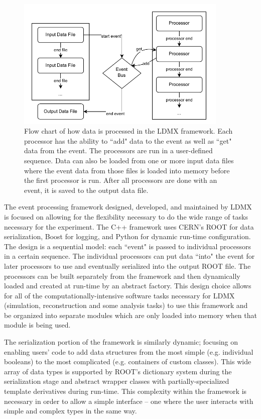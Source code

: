 \begin{figure}
    \centering
    \includegraphics[width=0.9\textwidth]{figures/ldmx/simulation/FrameworkFlowChart.drawio.pdf}
    \caption{Flow chart of how data is processed in the LDMX framework. Each processor has the ability to ``add" data to the event as well as ``get" data from the event. The processors are run in a user-defined sequence. Data can also be loaded from one or more input data files where the event data from those files is loaded into memory before the first processor is run. After all processors are done with an event, it is saved to the output data file.}
    \label{fig:ldmx:sim:data-flow}
\end{figure}

The event processing framework designed, developed, and maintained by LDMX is focused on allowing for the flexibility necessary to do the wide range of tasks necessary for the experiment. The C++ framework uses CERN's ROOT \cite{cernroot} for data serialization, Boost  for logging, and Python \cite{python} for dynamic run-time configuration. The design is a sequential model: each ``event" is passed to individual processors in a certain sequence. The individual processors can put data ``into" the event for later processors to use and eventually serialized into the output ROOT file. The processors can be built separately from the framework and then dynamically loaded and created at run-time by an abstract factory. This design choice allows for all of the computationally-intensive software tasks necessary for LDMX (simulation, reconstruction and some analysis tasks) to use this framework and be organized into separate modules which are only loaded into memory when that module is being used.

The serialization portion of the framework is similarly dynamic; focusing on enabling users' code to add data structures from the most simple (e.g. individual booleans) to the most complicated (e.g. containers of custom classes). This wide array of data types is supported by ROOT's dictionary system during the serialization stage and abstract wrapper classes with partially-specialized template derivatives during run-time. This complexity within the framework is necessary in order to allow a simple interface -- one where the user interacts with simple and complex types in the same way.


